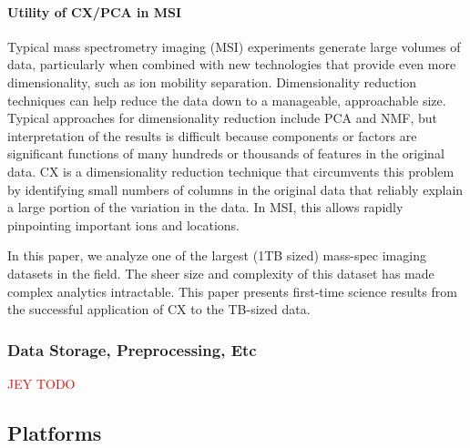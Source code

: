 
\paragraph{Utility of CX/PCA in MSI}
Typical mass spectrometry imaging (MSI) experiments generate large volumes of data, particularly when combined with new
technologies that provide even more dimensionality, such as ion mobility separation.
Dimensionality reduction techniques can help reduce the data down to a manageable, approachable size.
Typical approaches for dimensionality reduction include PCA and NMF, but interpretation of the results is difficult
because components or factors are significant functions of many hundreds or thousands of features in the original data.
CX is a dimensionality reduction technique that circumvents this problem by identifying small numbers of columns in the
original data that reliably explain a large portion of the variation in the data.
In MSI, this allows rapidly pinpointing important ions and locations.

In this paper, we analyze one of the largest (1TB sized) mass-spec imaging datasets in the field. The sheer size and complexity of this dataset
has made complex analytics intractable. This paper presents first-time science results from the successful application of CX to the TB-sized data.

\subsubsection{Data Storage, Preprocessing, Etc}
\textcolor{red}{JEY TODO}

\subsection{Platforms}

